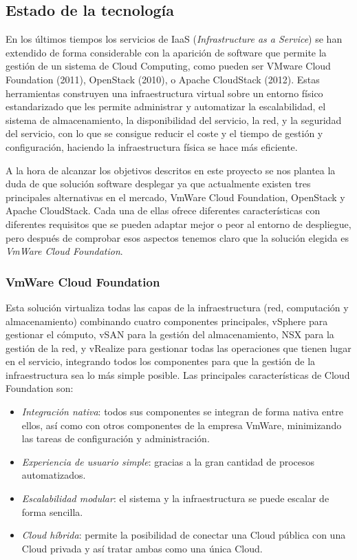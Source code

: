 \subsection{Estado de la tecnología}

En los últimos tiempos los servicios de IaaS (\textit{Infrastructure as a Service}) se han extendido de forma considerable con la aparición de software que permite la gestión de un sistema de Cloud Computing, como pueden ser VMware Cloud Foundation (2011), OpenStack (2010), o Apache CloudStack (2012). Estas herramientas construyen una infraestructura virtual sobre un entorno físico estandarizado que les permite administrar y automatizar la escalabilidad, el sistema de almacenamiento, la disponibilidad del servicio, la red, y la seguridad del servicio, con lo que se consigue reducir el coste y el tiempo de gestión y configuración, haciendo la infraestructura física se hace más eficiente.

A la hora de alcanzar los objetivos descritos en este proyecto se nos plantea la duda de que solución software desplegar ya que actualmente existen tres principales alternativas en el mercado, VmWare Cloud Foundation, OpenStack y Apache CloudStack. Cada una de ellas ofrece diferentes características con diferentes requisitos que se pueden adaptar mejor o peor al entorno de despliegue, pero después de comprobar esos aspectos tenemos claro que la solución elegida es \emph{VmWare Cloud Foundation}.

\subsubsection{VmWare Cloud Foundation}
Esta solución virtualiza todas las capas de la infraestructura (red, computación y almacenamiento) combinando cuatro componentes principales, vSphere para gestionar el cómputo, vSAN para la gestión del almacenamiento, NSX para la gestión de la red, y vRealize para gestionar todas las operaciones que tienen lugar en el servicio, integrando todos los componentes para que la gestión de la infraestructura sea lo más simple posible. Las principales características de Cloud Foundation son:\\
\begin{itemize}
    \item \emph{Integración nativa}: todos sus componentes se integran de forma nativa entre ellos, así como con otros componentes de la empresa VmWare, minimizando las tareas de configuración y administración.
    \item \emph{Experiencia de usuario simple}: gracias a la gran cantidad de procesos automatizados.
    \item \emph{Escalabilidad modular}: el sistema y la infraestructura se puede escalar de forma sencilla.
    \item \emph{Cloud híbrida}: permite la posibilidad de conectar una Cloud pública con una Cloud privada y así tratar ambas como una única Cloud.
\end{itemize}

